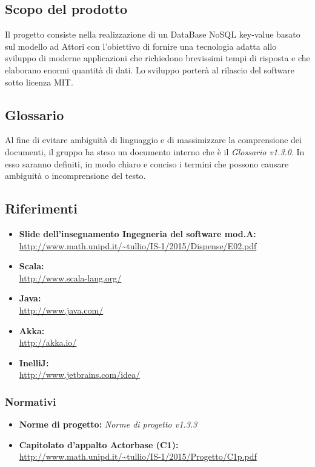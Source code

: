 \documentclass[a4paper]{article}
\begin{document}
	\subsection{Scopo del prodotto}
		Il progetto consiste nella realizzazione di un DataBase NoSQL key-value basato sul modello ad 
		Attori con l'obiettivo di fornire una tecnologia adatta allo sviluppo di moderne 
		applicazioni che richiedono brevissimi tempi di risposta e che elaborano enormi quantità 
		di dati. Lo sviluppo porterà al rilascio del software sotto licenza MIT.
	\subsection{Glossario}
		Al fine di evitare ambiguità di linguaggio e di massimizzare la comprensione dei documenti, il 
      gruppo ha steso un documento interno che è il \emph{Glossario v1.3.0}. In esso saranno definiti, in modo
      chiaro e conciso i termini che possono causare ambiguità o incomprensione del testo.
	\subsection{Riferimenti}
		\begin{itemize}
			\item \textbf{Slide dell'insegnamento Ingegneria del software mod.A:} \\
			\url{http://www.math.unipd.it/~tullio/IS-1/2015/Dispense/E02.pdf}
			\item \textbf{Scala:} \\
			\url{http://www.scala-lang.org/}
			\item \textbf{Java:} \\
			\url{http://www.java.com/}
			\item \textbf{Akka:} \\
			\url{http://akka.io/}
			\item \textbf{InelliJ:} \\
			\url{http://www.jetbrains.com/idea/}
		\end{itemize}
	\subsubsection{Normativi}
		\begin{itemize}
			\item \textbf{Norme di progetto:} \emph{Norme di progetto v1.3.3}
			\item \textbf{Capitolato d'appalto Actorbase (C1):} \\ 
			\url{http://www.math.unipd.it/~tullio/IS-1/2015/Progetto/C1p.pdf}
		\end{itemize}
		
\end{document}
